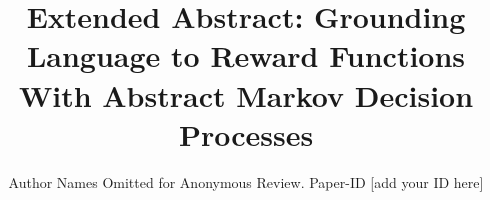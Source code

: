 \documentclass[conference]{IEEEtran}
\begin{document}
\title{Extended Abstract: Grounding Language to Reward Functions With Abstract Markov Decision Processes}

\author{Author Names Omitted for Anonymous Review. Paper-ID [add your ID here]}





%


\maketitle
\end{document}
